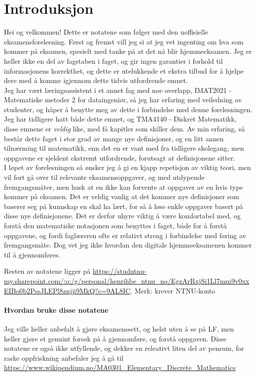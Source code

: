 \section{Introduksjon}

Hei og velkommen! Dette er notatene som følger med den uoffisielle eksamensforelesning.
Først og fremst vill jeg si at jeg vet ingenting om hva som kommer på eksamen,
spesielt med tanke på at det nå blir hjemmeeksamen. Jeg er heller ikke en del av fagstaben
i faget, og gir ingen garantier i forhold til informasjonens korrekthet, og dette er utelukkende
et ekstra tilbud for å hjelpe dere med å komme igjennom dette tidvis utfordrende emnet.\\

\noindent Jeg har vært læringsassistent i et annet fag med noe overlapp, IMAT2021 - Matematiske metoder 2 for dataingeniør,
så jeg har erfaring med veiledning av studenter, og håper å benytte meg av dette i forbindelse med denne forelesningen.
Jeg har tidligere hatt både dette emnet, og TMA4140 - Diskret Matematikk, disse emnene er \textit{veldig} like, med 
få kapitler som skiller dem. Av min erfaring, så består dette faget i stor grad av mange nye definisjoner,
og en litt annen tilnærming til matematikk, enn det en er vant med fra tidligere skolegang, men oppgavene er sjeldent 
ekstremt utfordrende, forutsagt at definisjonene sitter.\\

\noindent I løpet av forelesningen så ønsker jeg å gi en kjapp repetisjon av viktig teori,
men vil fort gå over til relevante eksamensoppgaver, og med utdypende fremgangsmåter, men husk at en ikke kan forvente
at oppgaver av en hvis type kommer på eksamen. Det er veldig vanlig at det kommer nye definisjoner som baserer seg på
kunnskap en skal ha lært, for så å løse enkle oppgaver basert på disse nye definisjonene. Det er derfor uhyre viktig
å være komfortabel med, og forstå den matematiske notasjonen som benyttes i faget, både for å forstå oppgavene, og
fordi faglæreren ofte er relativt streng i forbindelse med føring av fremgangsmåte. Dog vet jeg ikke hvordan den
digitale hjemmeeksamenen kommer til å gjennomføres. 

Resten av notatene ligger på \url{https://studntnu-my.sharepoint.com/:o:/g/personal/henrihbe_ntnu_no/EgzArRxjSi1Ll7mm9v0xxEIBo0b2PssJLEPl8znjji9MkQ?e=9AL8IC}. Merk: krever NTNU-konto

\paragraph*{Hvordan bruke disse notatene} Jeg ville heller anbefalt å gjøre eksamenssett, og helst uten å se på LF, men 
heller gjøre et genuint forsøk på å gjennomføre, og forstå oppgaven. Disse notatene er også ikke utfyllende, og dekker en releativt liten del av pensum,
for raske oppfriskning anbefaler jeg å gå til \url{https://www.wikipendium.no/MA0301_Elementary_Discrete_Mathematics}
